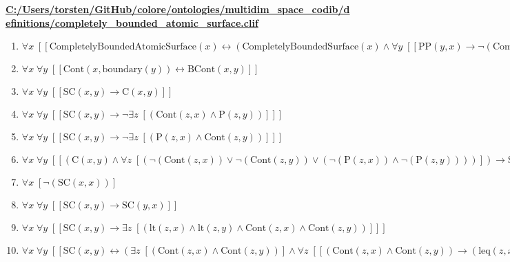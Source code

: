 \documentclass{article}
\begin{document}
\textbf{\url{C:/Users/torsten/GitHub/colore/ontologies/multidim\_space\_codib/definitions/completely\_bounded\_atomic\_surface.clif}}

\begin{enumerate}
\item $\forall x\;  \left[ \left[ \textrm{CompletelyBoundedAtomicSurface}(x) \leftrightarrow \left(\textrm{CompletelyBoundedSurface}(x) \land \forall y\;  \left[ \left[ \textrm{PP}(y,x) \rightarrow \neg \left(\textrm{CompletelyBoundedSurface}(y)\right) \right] \right]\right) \right] \right]$
\item $\forall x\; \forall y\;  \left[ \left[ \textrm{Cont}(x,\textrm{boundary}(y)) \leftrightarrow \textrm{BCont}(x,y) \right] \right]$
\item $\forall x\; \forall y\;  \left[ \left[ \textrm{SC}(x,y) \rightarrow \textrm{C}(x,y) \right] \right]$
\item $\forall x\; \forall y\;  \left[ \left[ \textrm{SC}(x,y) \rightarrow \neg \exists z\;  \left[ \left(\textrm{Cont}(z,x) \land \textrm{P}(z,y)\right) \right] \right] \right]$
\item $\forall x\; \forall y\;  \left[ \left[ \textrm{SC}(x,y) \rightarrow \neg \exists z\;  \left[ \left(\textrm{P}(z,x) \land \textrm{Cont}(z,y)\right) \right] \right] \right]$
\item $\forall x\; \forall y\;  \left[ \left[ \left(\textrm{C}(x,y) \land \forall z\;  \left[ \left(\neg \left(\textrm{Cont}(z,x)\right) \lor \neg \left(\textrm{Cont}(z,y)\right) \lor \left(\neg \left(\textrm{P}(z,x)\right) \land \neg \left(\textrm{P}(z,y)\right)\right)\right) \right]\right) \rightarrow \textrm{SC}(x,y) \right] \right]$
\item $\forall x\;  \left[ \neg \left(\textrm{SC}(x,x)\right) \right]$
\item $\forall x\; \forall y\;  \left[ \left[ \textrm{SC}(x,y) \rightarrow \textrm{SC}(y,x) \right] \right]$
\item $\forall x\; \forall y\;  \left[ \left[ \textrm{SC}(x,y) \rightarrow \exists z\;  \left[ \left(\textrm{lt}(z,x) \land \textrm{lt}(z,y) \land \textrm{Cont}(z,x) \land \textrm{Cont}(z,y)\right) \right] \right] \right]$
\item $\forall x\; \forall y\;  \left[ \left[ \textrm{SC}(x,y) \leftrightarrow \left(\exists z\;  \left[ \left(\textrm{Cont}(z,x) \land \textrm{Cont}(z,y)\right) \right] \land \forall z\;  \left[ \left[ \left(\textrm{Cont}(z,x) \land \textrm{Cont}(z,y)\right) \rightarrow \left(\textrm{leq}(z,x) \land \neg \left(\textrm{EqDim}(z,x)\right) \land \textrm{leq}(z,y) \land \neg \left(\textrm{EqDim}(z,y)\right)\right) \right] \right]\right) \right] \right]$

\end{enumerate}
\end{document}
